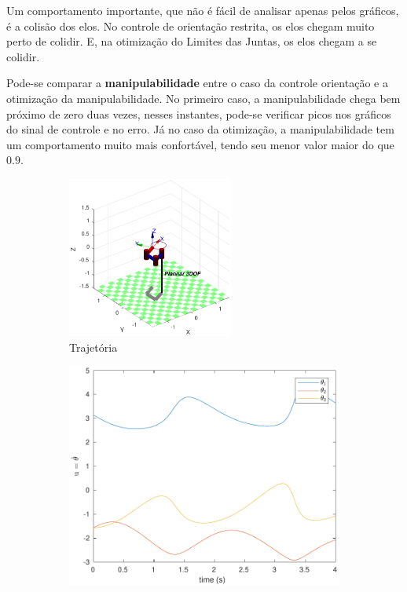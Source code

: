 \documentclass[a4paper,11pt]{article}
\theoremstyle{mytheor}
\begin{document}
Um comportamento importante, que não é fácil de analisar apenas pelos gráficos, é a colisão dos elos. No controle de orientação restrita, os elos chegam muito perto de colidir. E, na otimização do Limites das Juntas, os elos chegam a se colidir.

Pode-se comparar a \textbf{manipulabilidade} entre o caso da controle orientação e a otimização da manipulabilidade. No primeiro caso, a manipulabilidade chega bem próximo de zero duas vezes, nesses instantes, pode-se verificar picos nos gráficos do sinal de controle e no erro. Já no caso da otimização, a manipulabilidade tem um comportamento muito mais confortável, tendo seu menor valor maior do que $0.9$.

\begin{figure}[!ht]
\centering
  \begin{minipage}{\linewidth}
  \centering
    \begin{subfigure}[b]{1\textwidth}
    \centering
    \includegraphics[width=0.6\textwidth]{figs/ex2_1_traj.pdf}
    \caption{Trajetória}
    \label{fig:ex2_1_traj}
    \end{subfigure}
  \end{minipage}
  \begin{minipage}{\linewidth}
  \centering
    \begin{subfigure}[b]{0.49\textwidth}
    \includegraphics[width=1\textwidth]{figs/ex2_1_q.pdf}

\end{subfigure}
\end{minipage}
\end{figure}
\end{document}
